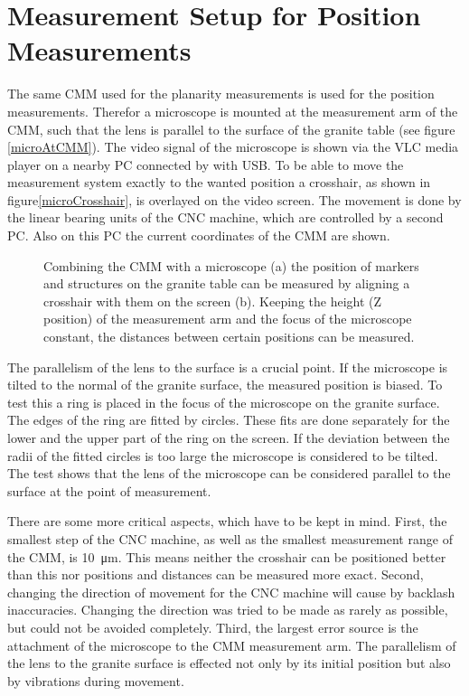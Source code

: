 \documentclass[
a4paper,                                %
twoside,                                %
BCOR1.4cm,                      %
10pt,                           %
headings=normal,                %
headsepline,                    %
clearplainpage, %
final,                                  %
div=14,
parskip=full,
openright,
bibliography=toc
]{scrreprt}
\begin{document}
\section{Measurement Setup for Position Measurements}

The same CMM used for the planarity measurements is used for the position measurements. Therefor a microscope is mounted at the measurement arm of the CMM, such that the lens is parallel to the surface of the granite table (see figure \ref{microAtCMM}). The video signal of the microscope is shown via the VLC media player on a nearby PC connected by with USB. To be able to move the measurement system exactly to the wanted position a crosshair, as shown in figure\ref{microCrosshair}, is overlayed on the video screen. The movement is done by the linear bearing units of the CNC machine, which are controlled by a second PC.  Also on this PC the current coordinates of the CMM are shown.

\begin{figure}[H]	
	\centering
	\qquad
	\caption{Combining the CMM with a microscope (a) the position of markers and structures on the granite table can be measured by aligning a crosshair with them on the screen (b). Keeping the height (Z position) of the measurement arm and the focus of the microscope constant, the distances between certain positions can be measured.}
	\label{microCMMsetup}
\end{figure}

The parallelism of the lens to the surface is a crucial point. If the microscope is tilted to the normal of the granite surface, the measured position is biased. To test this a ring is placed in the focus of the microscope on the granite surface. The edges of the ring are fitted by circles. These fits are done separately for the lower and the upper part of the ring on the screen. If the deviation between the radii of the fitted circles is too large the microscope is considered to be tilted. The test shows that the lens of the microscope can be considered parallel to the surface at the point of measurement.

There are some more critical aspects, which have to be kept in mind. First, the smallest step of the CNC machine, as well as the smallest measurement range of the CMM, is \SI{10}{\micro\m}. This means neither the crosshair can be positioned better than this nor positions and distances can be measured more exact. Second, changing the direction of movement for the CNC machine will cause by backlash inaccuracies. Changing the direction was tried to be made as rarely as possible, but could not be avoided completely. Third, the largest error source is the attachment of the microscope to the CMM measurement arm. The parallelism of the lens to the granite surface is effected not only by its initial position but also by vibrations during movement.
\end{document}
